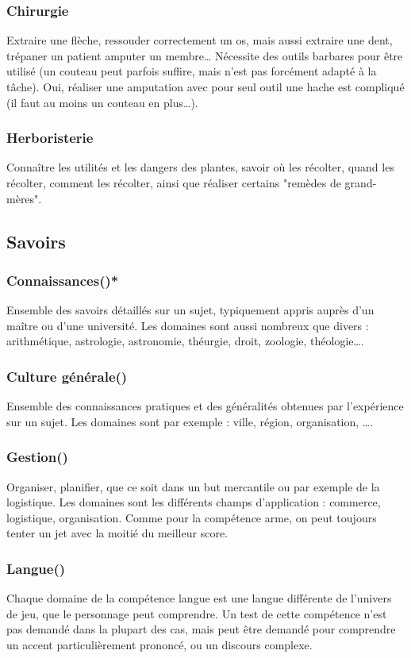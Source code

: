 \documentclass[10pt,a4paper,twocolumn]{book}
\begin{document}
\subsubsection{Chirurgie }
Extraire une flèche, ressouder correctement un os, mais aussi extraire une dent, trépaner un patient amputer un membre… Nécessite des outils barbares pour être utilisé (un couteau peut parfois suffire, mais n’est pas forcément adapté à la tâche). Oui, réaliser une amputation avec pour seul outil une hache est compliqué (il faut au moins un couteau en plus…).
\subsubsection{Herboristerie}
Connaître les utilités et les dangers des plantes, savoir où les récolter, quand les récolter, comment les récolter, ainsi que réaliser certains "remèdes de grand-mères".

\subsection{Savoirs}
\subsubsection{Connaissances()*}
Ensemble des savoirs détaillés sur un sujet, typiquement appris auprès d’un maître ou d’une université. Les domaines sont aussi nombreux que divers : arithmétique, astrologie, astronomie, théurgie, droit, zoologie, théologie….
\subsubsection{Culture générale()}
Ensemble des connaissances pratiques et des généralités obtenues par l’expérience sur un sujet. Les domaines sont par exemple : ville, région, organisation, ….
\subsubsection{Gestion()}
Organiser, planifier, que ce soit dans un but mercantile ou par exemple de la logistique. Les domaines sont les différents champs d’application : commerce, logistique, organisation.  Comme pour la compétence arme, on peut toujours tenter un jet avec la moitié du meilleur score.
\subsubsection{Langue()}
Chaque domaine de la compétence langue est une langue différente de l’univers de jeu, que le personnage peut comprendre.
Un test de cette compétence n’est pas demandé dans la plupart des cas, mais peut être demandé pour comprendre un accent particulièrement prononcé, ou un discours complexe.
\end{document}
